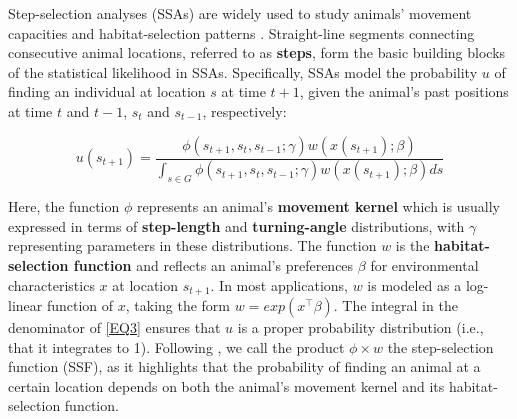 \documentclass[../FinalThesis.tex]{subfiles}
\begin{document}
Step-selection analyses (SSAs) are widely used to study animals' movement
capacities and habitat-selection patterns \citep{Fortin.2005, Thurfjell.2014}.
Straight-line segments connecting consecutive animal locations, referred to as
\textbf{steps}, form the basic building blocks of the statistical likelihood in
SSAs. Specifically, SSAs model the probability $u$ of finding an individual at
location $s$ at time $t+1$, given the animal's past positions at time $t$ and
$t-1$, $s_t$ and $s_{t-1}$, respectively:

\begin{equation}
\label{EQ3}
u(s_{t+1}) = \frac{\phi(s_{t+1}, s_t, s_{t-1}; \gamma)w(x(s_{t+1}); \beta)}{\int_{s \in G}\phi(s_{t+1}, s_{t}, s_{t-1}; \gamma)w(x(s_{t+1}); \beta)ds}
\end{equation}

\noindent Here, the function $\phi$ represents an animal's \textbf{movement
kernel} which is usually expressed in terms of \textbf{step-length} and
\textbf{turning-angle} distributions, with $\gamma$ representing parameters in
these distributions. The function $w$ is the \textbf{habitat-selection function}
and reflects an animal's preferences $\beta$ for environmental characteristics
$x$ at location $s_{t+1}$. In most applications, $w$ is modeled as a log-linear
function of $x$, taking the form $w = exp(x^\top\beta)$. The integral in the
denominator of \ref{EQ3} ensures that $u$ is a proper probability distribution
(i.e., that it integrates to 1). Following \citet{Michelot.2024}, we call the
product $\phi \times w$ the step-selection function (SSF), as it highlights that
the probability of finding an animal at a certain location depends on both the
animal's movement kernel and its habitat-selection function.


\end{document}
